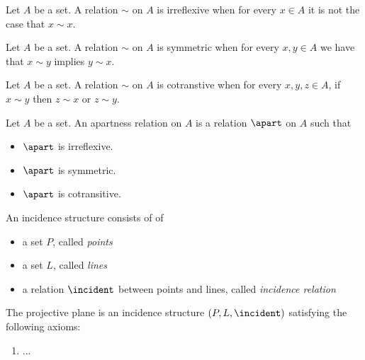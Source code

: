 







\begin{theorem}
   Let $A$ be a set.
   A relation $\sim$ on $A$ is irreflexive when
   for every $x\in A$ it is not the case that $x \sim x$.
 \end{theorem}

 \begin{theorem}
   Let $A$ be a set.
   A relation $\sim$ on $A$ is symmetric when
   for every $x,y \in A$ we have that $x\sim y$ implies $y\sim x$.
\end{theorem}

\begin{theorem}
   Let $A$ be a set.
   A relation $\sim$ on $A$ is cotranstive when
   for every $x,y,z\in A$, if $x\sim y$ then $z\sim x$ or $z\sim y$.
 \end{theorem}

\begin{define-relation}
   Let $A$ be a set.
   An apartness relation on $A$ is a relation $\apart$ on $A$
   such that
   \begin{itemize}
      \item $\apart$ is irreflexive.
      \item $\apart$ is symmetric.
      \item $\apart$ is cotransitive.
   \end{itemize}
 \end{define-relation}



 \begin{theorem}
   An incidence structure consists of of
   \begin{itemize}
      \item a set $P$, called \textit{points}
      \item a set $L$, called \textit{lines}
      \item a relation $\incident$ between points and lines, called \textit{incidence relation}
   \end{itemize}
\end{theorem}


\begin{theorem}
   The projective plane is an incidence structure $(P, L, \incident)$
   satisfying the following axioms:
   \begin{enumerate}
      \item ...
   \end{enumerate}
\end{theorem}


